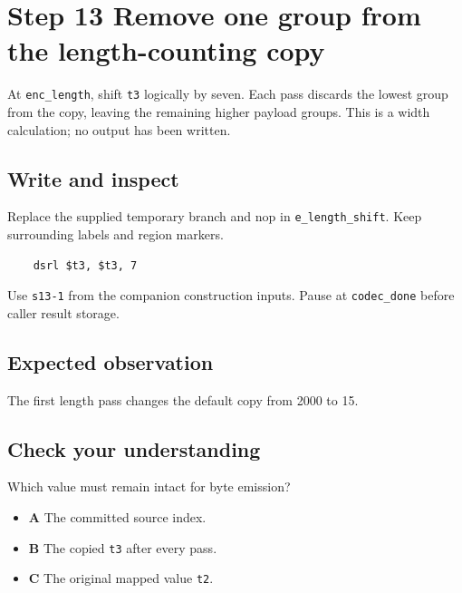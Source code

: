 \section{Step 13 Remove one group from the length-counting copy}\label{delta-s13}

At \texttt{enc\_length}, shift \texttt{t3} logically by seven. Each pass discards the lowest group from the copy, leaving the remaining higher payload groups. This is a width calculation; no output has been written.

\subsection{Write and inspect}
Replace the supplied temporary branch and nop in \texttt{e\_length\_shift}. Keep surrounding labels and region markers.

\begin{verbatim}
    dsrl $t3, $t3, 7
\end{verbatim}
Use \texttt{s13-1} from the companion construction inputs. Pause at \texttt{codec\_done} before caller result storage.

\subsection{Expected observation}
The first length pass changes the default copy from 2000 to 15.

\subsection{Check your understanding}
Which value must remain intact for byte emission?

\begin{itemize}
  \item \textbf{A} The committed source index.
  \item \textbf{B} The copied \texttt{t3} after every pass.
  \item \textbf{C} The original mapped value \texttt{t2}.
\end{itemize}
